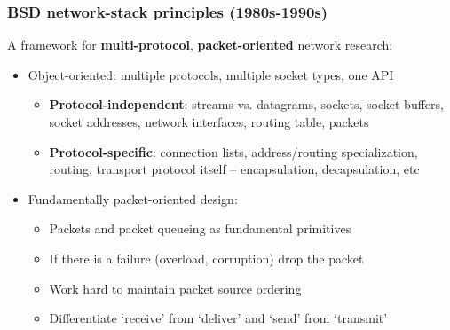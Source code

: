 \begin{frame}
\begin{columns}[T]
\begin{itemize}
    \end{itemize}
  \end{columns}
\end{frame}

\begin{frame}
  \frametitle{BSD network-stack principles (1980s-1990s)}

   A framework for \textbf{multi-protocol}, \textbf{packet-oriented} network
   research:

   \medskip
   \pause

  \begin{itemize}
    \item Object-oriented: multiple protocols, multiple socket types, one API
    \begin{itemize}

      \pause

      \item \textbf{Protocol-independent}: streams vs. datagrams, sockets,
	socket buffers, socket addresses, network interfaces, routing table,
	packets

      \pause

      \item \textbf{Protocol-specific}: connection lists, address/routing
	specialization, routing, transport protocol itself -- encapsulation,
	decapsulation, etc
    \end{itemize}

    \medskip
    \pause

    \item Fundamentally packet-oriented design:
    \begin{itemize}
      \item Packets and packet queueing as fundamental primitives

      \pause

      \item If there is a failure (overload, corruption) drop the packet

      \pause

      \item Work hard to maintain packet source ordering

      \pause

      \item Differentiate `receive' from `deliver' and `send' from `transmit'

      \pause


\end{itemize}
\end{itemize}
\end{frame}
